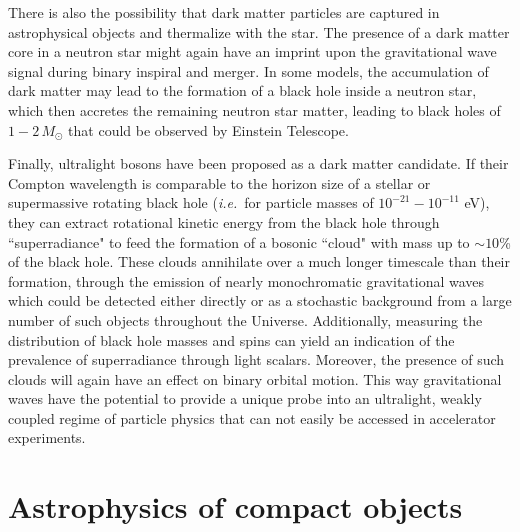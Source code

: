 There is also the possibility that dark matter particles are captured in astrophysical
objects and thermalize with the star. The presence of a dark matter core in a neutron star
might again have an imprint upon the gravitational wave signal during binary inspiral and merger.
In some models, the accumulation of dark matter may lead to the formation of a black hole 
inside a neutron star, which then accretes the remaining neutron star matter, leading to 
black holes of $1 - 2 \,M_\odot$ that could be observed by Einstein Telescope.

Finally, ultralight bosons have been proposed as a dark matter candidate. If their
Compton wavelength is comparable to the horizon size of a stellar or supermassive 
rotating black hole (\emph{i.e.}~for particle masses of $10^{-21} - 10^{-11}$ eV),
they can extract rotational kinetic energy from the black hole through ``superradiance" 
to feed the formation
of a bosonic ``cloud" with mass up to $\sim 10$\% of the black hole. These clouds
annihilate over a much longer timescale than their formation, through the emission of 
nearly monochromatic gravitational waves which could be detected either directly 
or as a stochastic background from a large number of such objects throughout the Universe.
Additionally, measuring the distribution of black hole masses and spins can yield
an indication of the prevalence of superradiance through light scalars. Moreover, 
the presence of such clouds will again have an effect on binary orbital motion. 
This way gravitational waves have the potential to provide a unique probe into 
an ultralight, weakly coupled regime of particle physics that can not easily be
accessed in accelerator experiments.

\section{Astrophysics of compact objects}\label{sec:astrophy}

